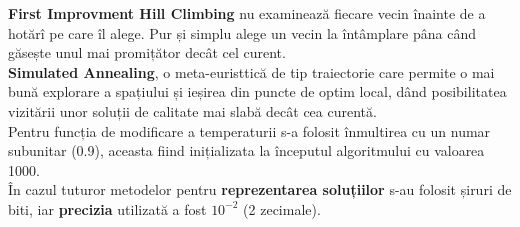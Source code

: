 \documentclass{article}
\begin{document}
\textbf{First Improvment Hill Climbing} nu examinează fiecare vecin înainte de a hotărî pe care îl alege. Pur și simplu alege un vecin la întâmplare pâna când găsește unul mai promițător decât cel curent.\\
\textbf{Simulated Annealing}, o meta-euristtică de tip traiectorie care permite o mai bună explorare a spațiului 
și ieșirea din puncte de optim local, dând posibilitatea vizitării unor soluții de calitate mai slabă decât cea curentă. \\
Pentru funcția de modificare a temperaturii s-a folosit înmultirea cu un numar subunitar (0.9), aceasta fiind inițializata la începutul algoritmului cu valoarea 1000.\\
În cazul tuturor metodelor pentru \textbf{reprezentarea soluțiilor} s-au folosit șiruri de biti, iar \textbf{precizia} utilizată a fost $10^{-2}$ (2 zecimale).
\end{document}
